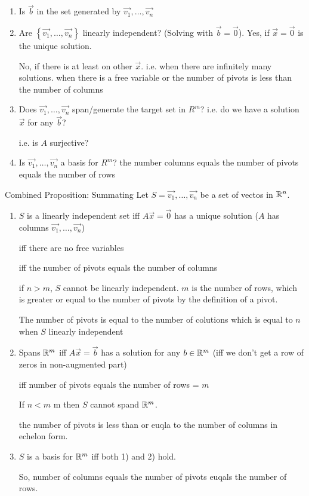 \begin{enumerate}
  \item Is $\vec{b}$ in the set generated by ${\vec{v_1},\ldots,\vec{v_n}}$ 
  \item Are $\left\{ \vec{v_1},\ldots,\vec{v_n} \right\} $ linearly independent? (Solving with $\vec{b}=\vec{0}$).
    Yes, if $\vec{x}=\vec{0}$ is the unique solution.
    
    No, if there is at least on other $\vec{x}$. i.e. when there are infinitely many solutions.
    when there is a free variable or the number of pivots is less than the number of columns
  \item Does ${\vec{v_1},\ldots,\vec{v_n}}$ span/generate the target set in $R^{m}$?
    i.e. do we have a solution $\vec{x}$ for any $\vec{b}$?

    i.e. is $A$ surjective?
  \item Is $\vec{v_1},\ldots,\vec{v_n}$ a basis for $R^{m}$?
    the number columns equals the number of pivots equals the number of rows
\end{enumerate}


\proposition{}

Combined Proposition: Summating
Let $S={\vec{v_1},\ldots,\vec{v_n}}$ be a set of vectos in $\mathbb{R}^{n}$.

\begin{enumerate}
  \item $S$ is a linearly independent set iff $A\vec{x}=\vec{0}$ has a unique solution ($A$ has columns  $\vec{v_1},\ldots,\vec{v_n}$)

    iff there are no free variables

    iff the number of pivots equals the number of columns

if $n>m$, $S$ cannot be linearly independent.
$m$ is the number of rows, which is greater or equal to the number of pivots by the definition of a pivot. 

The number of pivots is equal to the number of colutions which is equal to $n$ when $S$ linearly independent

  \item Spans $\mathbb{R}^{m}$ iff $A\vec{x}=\vec{b}$ has a solution for any $b \in \mathbb{R}^{m}$
    (iff we don't get a row of zeros in non-augmented part)

    iff number of pivots equals the number of rows = $m$

    If $n<m$ m then $S$ cannot spand $\mathbb{R}^{m}$.

    the number of pivots is less than or euqla to the number of columns in echelon form.

  \item $S$ is a basis for $\mathbb{R}^{m}$ iff both 1) and 2) hold.

    So, number of columns equals the number of pivots euqals the number of rows.
\end{enumerate}

